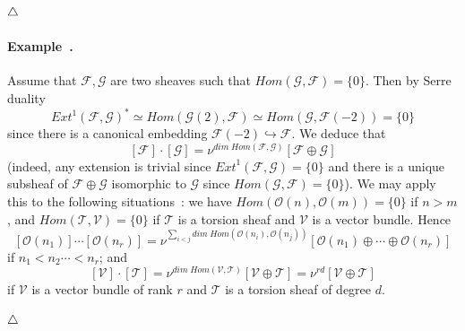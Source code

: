 \documentclass[a4paper,10pt]{amsart}
\def\endexample{$\hfill \triangle$}
\def\O{\mathcal{O}}
\numberwithin{equation}{section}
\begin{document}
\endexample

\vspace{.15in}

\addtocounter{theo}{1}
\paragraph{\textbf{Example~\thetheo.}} Assume that $\mathcal{F}, \mathcal{G}$ are two sheaves such that ${Hom}(\mathcal{G},\mathcal{F})=\{0\}$. Then by Serre duality
$${Ext}^1(\mathcal{F},\mathcal{G})^* \simeq {Hom}(\mathcal{G}(2),\mathcal{F}) \simeq {Hom}(\mathcal{G}, \mathcal{F}(-2))=\{0\}$$
since there is a canonical embedding $\mathcal{F}(-2) \hookrightarrow \mathcal{F}$. We deduce that
$$[\mathcal{F}] \cdot [\mathcal{G}]=\nu^{{dim\;Hom}(\mathcal{F},\mathcal{G})}[\mathcal{F} \oplus \mathcal{G}]$$
(indeed, any extension is trivial since ${Ext}^1(\mathcal{F},\mathcal{G})=\{0\}$ and there is a unique subsheaf of $\mathcal{F}\oplus \mathcal{G}$ isomorphic to $\mathcal{G}$ since ${Hom}(\mathcal{G},\mathcal{F})=\{0\}$). We may apply this to the following situations~: we have ${Hom}(\O(n),\O(m))=\{0\}$ if $n > m$, and ${Hom}(\mathcal{T},\mathcal{V})=\{0\}$ if $\mathcal{T}$ is a torsion sheaf and $\mathcal{V}$ is a vector bundle. Hence
\begin{equation}\label{E:productofos}
[\O(n_1)]  \cdots [\O(n_r)]=\nu^{\sum_{i < j} {dim\;Hom}(\O(n_i),\O(n_j))}[\mathcal{O}(n_1) \oplus \cdots \oplus \mathcal{O}(n_r)]
\end{equation}
if $n_1 < n_2 \cdots < n_r$; and
\begin{equation}\label{E:productvecttor}
[\mathcal{V}] \cdot [\mathcal{T}]=\nu^{{dim\;Hom}(\mathcal{V},\mathcal{T})}[\mathcal{V}\oplus \mathcal{T}]=\nu^{rd}[\mathcal{V}\oplus\mathcal{T}]
\end{equation}
if $\mathcal{V}$ is a vector bundle of rank $r$ and $\mathcal{T}$ is a torsion sheaf of degree $d$.

\endexample

\vspace{.15in}

\addtocounter{theo}{1}
\end{document}
